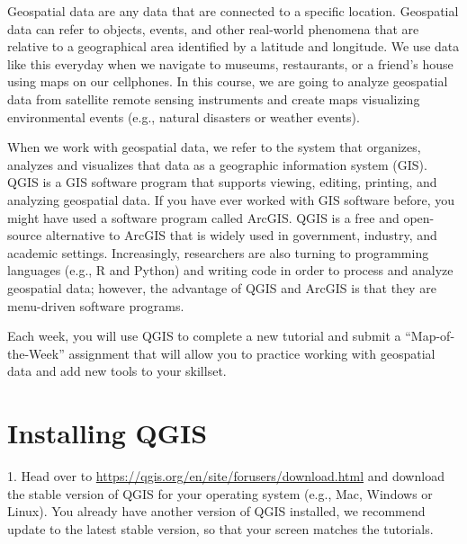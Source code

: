 \documentclass[oneside,a4paper,11pt,explicit]{book}
\begin{document}
Geospatial data are any data that are connected to a specific location. Geospatial data can refer to objects, events, and other real-world phenomena that are relative to a geographical area identified by a latitude and longitude. We use data like this everyday when we navigate to museums, restaurants, or a friend's house using maps on our cellphones. In this course, we are going to analyze geospatial data from satellite remote sensing instruments and create maps visualizing environmental events (e.g., natural disasters or weather events). 

When we work with geospatial data, we refer to the system that organizes, analyzes and visualizes that data as a geographic information system (GIS). QGIS is a GIS software program that supports viewing, editing, printing, and analyzing geospatial data.  If you have ever worked with GIS software before, you might have used a software program called ArcGIS. QGIS is a free and open-source alternative to ArcGIS that is widely used in government, industry, and academic settings. Increasingly, researchers are also turning to programming languages (e.g., R and Python) and writing code in order to process and analyze geospatial data; however, the advantage of QGIS and ArcGIS is that they are menu-driven software programs. 

Each week, you will use QGIS to complete a new tutorial and submit a ``Map-of-the-Week'' assignment that will allow you to practice working with geospatial data and add new tools to your skillset. 

\section{Installing QGIS}

1. Head over to \href{https://qgis.org/en/site/forusers/download.html}{https://qgis.org/en/site/forusers/download.html} and download the stable version of QGIS for your operating system (e.g., Mac, Windows or Linux). You already have another version of QGIS installed, we recommend update to the latest stable version, so that your screen matches the tutorials.

\end{document}
